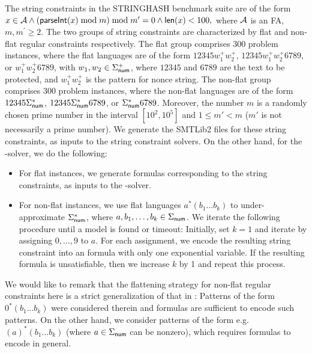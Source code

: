 The string constraints in the STRINGHASH benchmark suite are of the form 
%
$x \in \mathcal{A} \wedge \left( \textsf{parseInt}(x) \bmod m \right) \bmod m^\prime = 0   \notag \wedge \textsf{len}(x) < 100,$ 
%
where $\mathcal{A}$ is an FA, $m, m^\prime \ge 2.$ 
The two groups of string constraints are characterized by flat and non-flat regular constraints respectively.
The flat group comprises 300 problem instances, where the flat languages are of the form $12345w^+_1 w^+_2$,  $12345 w^+_1  w^+_2 6789$, or $w^+_1 w^+_2 6789$, with $w_1,w_2 \in \Sigma^+_{\sf num}$, where $12345$ and $6789$ are the text to be protected, and $w^+_1 w^+_2$ is the pattern for nonce string. The non-flat group comprises 300 problem instances, where the non-flat languages are of the form $12345\Sigma_{\sf num}^*$, $12345\Sigma_{\sf num}^* 6789$, or $\Sigma_{\sf num}^* 6789$. Moreover, the number $m$ is a randomly chosen prime number in the interval $[10^2, 10^5]$ and $1 \le m' < m$ ($m'$ is not necessarily a prime number). We generate the SMTLib2 files for these string constraints, as inputs to the string constraint solvers. On the other hand, for the {\paexp}-solver, we do the following:   
\begin{itemize}
\item For flat instances, we generate {\paexp} formulas corresponding to the string constraints, as inputs to the {\paexp}-solver.
\item For non-flat instances, we use flat languages $a^* (b_{1} \ldots b_{k})$ to under-approximate 
$\Sigma_{\sf num}^*$,  where $a, b_1,\ldots, b_k \in \Sigma_{\sf num}$. 
%
%
We iterate the following procedure until a model is found or timeout: Initially, set $k=1$ and iterate by assigning $0, \ldots, 9$ to $a$. For each assignment, we encode the resulting string constraint into an {\paexp} formula with only one exponential variable. If the resulting {\paexp} formula is unsatisfiable, then we increase $k$ by 1 and repeat this process. 
\end{itemize}
We would like to remark that the flattening strategy for non-flat regular constraints here is a strict generalization of that in \cite{Parosh:20:PLDI}: Patterns of the form $0^*(b_1...b_k)$ were considered therein and {\pa} formulas are sufficient to encode such patterns. On the other hand, we consider patterns of the form e.g. $(a)^* (b_1 \ldots b_k)$ (where $a \in \Sigma_{\sf num}$ can be nonzero), which requires {\paexp} formulas to encode in general.

